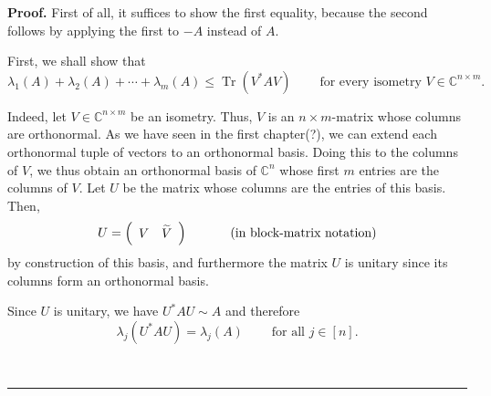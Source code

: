 \documentclass[numbers=enddot,12pt,final,onecolumn,notitlepage]{scrartcl}%
\numberwithin{exer}{subsection}
\theoremstyle{definition}
\newenvironment{proof}[1][Proof]{\noindent\textbf{#1.} }{\ \rule{0.5em}{0.5em}}
\begin{document}
\begin{proof}
First of all, it suffices to show the first equality, because the second
follows by applying the first to $-A$ instead of $A$.

First, we shall show that%
\[
\lambda_{1}\left(  A\right)  +\lambda_{2}\left(  A\right)  +\cdots+\lambda
_{m}\left(  A\right)  \leq\operatorname*{Tr}\left(  V^{\ast}AV\right)
\ \ \ \ \ \ \ \ \ \ \text{for every isometry }V\in\mathbb{C}^{n\times m}.
\]


Indeed, let $V\in\mathbb{C}^{n\times m}$ be an isometry. Thus, $V$ is an
$n\times m$-matrix whose columns are orthonormal. As we have seen in the first
chapter(?), we can extend each orthonormal tuple of vectors to an orthonormal
basis. Doing this to the columns of $V$, we thus obtain an orthonormal basis
of $\mathbb{C}^{n}$ whose first $m$ entries are the columns of $V$. Let $U$ be
the matrix whose columns are the entries of this basis. Then,%
\[
U=\left(
\begin{array}
[c]{cc}%
V & \widetilde{V}%
\end{array}
\right)  \ \ \ \ \ \ \ \ \ \ \left(  \text{in block-matrix notation}\right)
\]
by construction of this basis, and furthermore the matrix $U$ is unitary since
its columns form an orthonormal basis.

Since $U$ is unitary, we have $U^{\ast}AU\sim A$ and therefore%
\[
\lambda_{j}\left(  U^{\ast}AU\right)  =\lambda_{j}\left(  A\right)
\ \ \ \ \ \ \ \ \ \ \text{for all }j\in\left[  n\right]  .
\]



\end{proof}
\end{document}
